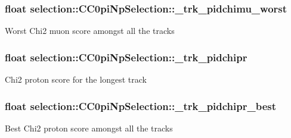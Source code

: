 \subsubsection[{\texorpdfstring{\+\_\+trk\+\_\+pidchimu\+\_\+worst}{_trk_pidchimu_worst}}]{\setlength{\rightskip}{0pt plus 5cm}float selection\+::\+C\+C0pi\+Np\+Selection\+::\+\_\+trk\+\_\+pidchimu\+\_\+worst\hspace{0.3cm}{\ttfamily [private]}}\hypertarget{classselection_1_1CC0piNpSelection_a9e88e0ae759d19106d964c13926fba4b}{}\label{classselection_1_1CC0piNpSelection_a9e88e0ae759d19106d964c13926fba4b}
Worst Chi2 muon score amongst all the tracks 
\subsubsection[{\texorpdfstring{\+\_\+trk\+\_\+pidchipr}{_trk_pidchipr}}]{\setlength{\rightskip}{0pt plus 5cm}float selection\+::\+C\+C0pi\+Np\+Selection\+::\+\_\+trk\+\_\+pidchipr\hspace{0.3cm}{\ttfamily [private]}}\hypertarget{classselection_1_1CC0piNpSelection_a712eaf6dc6086f1be5705a3bbe5226fc}{}\label{classselection_1_1CC0piNpSelection_a712eaf6dc6086f1be5705a3bbe5226fc}
Chi2 proton score for the longest track 
\subsubsection[{\texorpdfstring{\+\_\+trk\+\_\+pidchipr\+\_\+best}{_trk_pidchipr_best}}]{\setlength{\rightskip}{0pt plus 5cm}float selection\+::\+C\+C0pi\+Np\+Selection\+::\+\_\+trk\+\_\+pidchipr\+\_\+best\hspace{0.3cm}{\ttfamily [private]}}\hypertarget{classselection_1_1CC0piNpSelection_aaf0a2841494bc52da55d267bc3c8db3d}{}\label{classselection_1_1CC0piNpSelection_aaf0a2841494bc52da55d267bc3c8db3d}
Best Chi2 proton score amongst all the tracks 
